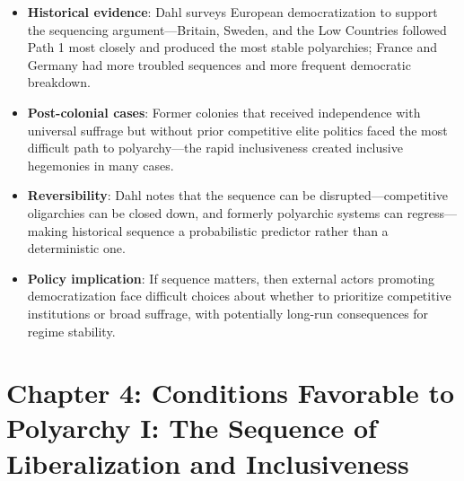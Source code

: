 \documentclass[12pt]{article}
\begin{document}
\begin{itemize}[leftmargin=*, itemsep=4pt]
    \item \textbf{Historical evidence}: Dahl surveys European democratization to support the sequencing argument---Britain, Sweden, and the Low Countries followed Path 1 most closely and produced the most stable polyarchies; France and Germany had more troubled sequences and more frequent democratic breakdown.
    \item \textbf{Post-colonial cases}: Former colonies that received independence with universal suffrage but without prior competitive elite politics faced the most difficult path to polyarchy---the rapid inclusiveness created inclusive hegemonies in many cases.
    \item \textbf{Reversibility}: Dahl notes that the sequence can be disrupted---competitive oligarchies can be closed down, and formerly polyarchic systems can regress---making historical sequence a probabilistic predictor rather than a deterministic one.
    \item \textbf{Policy implication}: If sequence matters, then external actors promoting democratization face difficult choices about whether to prioritize competitive institutions or broad suffrage, with potentially long-run consequences for regime stability.
\end{itemize}

\section{Chapter 4: Conditions Favorable to Polyarchy I: The Sequence of Liberalization and Inclusiveness}
\end{document}
